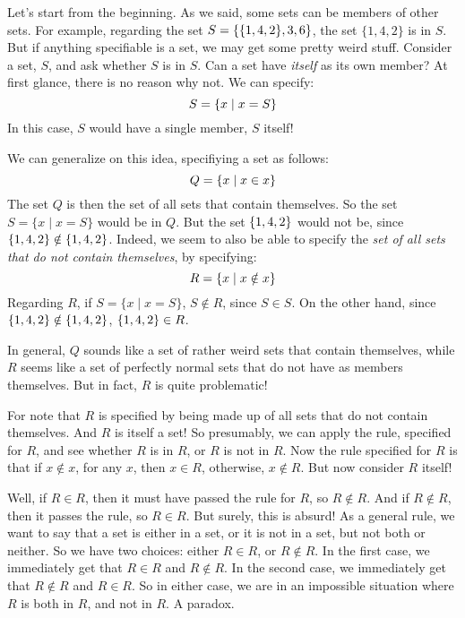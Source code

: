 Let's start from the beginning. As we said, some sets can be members of other sets. For example, regarding the set $S=\{\{1, 4, 2\}, 3, 6\}$, the set $\{1, 4, 2\}$ is in $S$. But if anything specifiable is a set, we may get some pretty weird stuff. Consider a set, $S$, and ask whether $S$ is in $S$. Can a set have \textit{itself} as its own member? At first glance, there is no reason why not. We can specify:
\[
S=\{x\mid x = S\}
\]
In this case, $S$ would have a single member, $S$ itself!

We can generalize on this idea, specifiying a set as follows:
\[
Q=\{x \mid x \in x\}
\]
The set $Q$ is then the set of all sets that contain themselves. So the set $S=\{x \mid x =S\}$ would be in $Q$. But the set $\{1, 4, 2\}$ would not be, since $\{1, 4, 2\} \notin \{1, 4, 2\}$. Indeed, we seem to also be able to specify the \textit{set of all sets that do not contain themselves}, by specifying:
\[
R=\{x \mid x \notin x\}
\]
Regarding $R$, if $S=\{x \mid x =S\}$, $S \notin R$, since $S \in S$. On the other hand, since $\{1, 4, 2\} \notin \{1, 4, 2\}$, $\{1, 4, 2\} \in R$. 

In general, $Q$ sounds like a set of rather weird sets that contain themselves, while $R$ seems like a set of perfectly normal sets that do not have as members themselves. But in fact, $R$ is quite problematic!

For note that $R$ is specified by being made up of all sets that do not contain themselves. And $R$ is itself a set! So presumably, we can apply the rule, specified for $R$, and see whether $R$ is in $R$, or $R$ is not in $R$. Now the rule specified for $R$ is that if $x \notin x$, for any $x$, then $x \in R$, otherwise, $x \notin R$. But now consider $R$ itself! 

Well, if $R \in R$, then it must have passed the rule for $R$, so $R \notin R$. And if $R \notin R$, then it passes the rule, so $R \in R$. But surely, this is absurd! As a general rule, we want to say that a set is either in a set, or it is not in a set, but not both or neither. So we have two choices: either $R \in R$, or $R \notin R$. In the first case, we immediately get that $R \in R$ and $R \notin R$. In the second case, we immediately get that $R \notin R$ and $R \in R$. So in either case, we are in an impossible situation where $R$ is both in $R$, and not in $R$. A paradox. 


